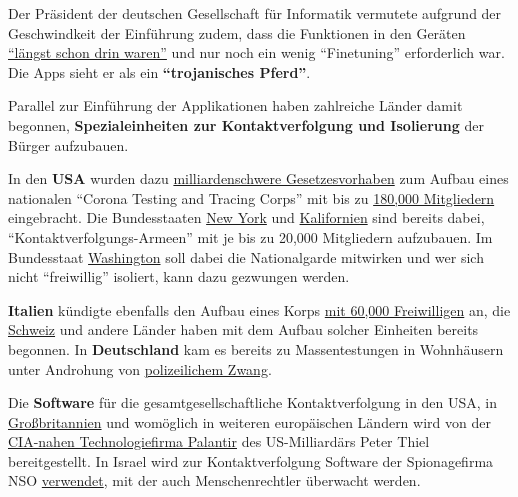 Der Präsident der deutschen Gesellschaft für Informatik vermutete
aufgrund der Geschwindkeit der Einführung zudem, dass die Funktionen in
den Geräten
\href{https://www.heise.de/news/Informatiker-Die-Corona-App-ist-wie-ein-trojanisches-Pferd-4764560.html}{``längst
schon drin waren''} und nur noch ein wenig ``Finetuning'' erforderlich
war. Die Apps sieht er als ein \textbf{``trojanisches Pferd''}.

Parallel zur Einführung der Applikationen haben zahlreiche Länder damit
begonnen, \textbf{Spezialeinheiten zur Kontaktverfolgung und Isolierung}
der Bürger aufzubauen.

In den \textbf{USA} wurden dazu
\href{https://heavy.com/news/2020/05/hr-6666-trace-bill-bobby-rush/}{milliardenschwere
Gesetzesvorhaben} zum Aufbau eines nationalen ``Corona Testing and
Tracing Corps'' mit bis zu
\href{https://www.washingtonpost.com/opinions/2020/05/29/corona-corps-could-fight-virus-youth-unemployment/}{180,000
Mitgliedern} eingebracht. Die Bundesstaaten
\href{https://www.jhsph.edu/news/news-releases/2020/johns-hopkins-and-bloomberg-philanthropies-with-new-york-state-launch-online-course-to-train-army-of-contact-tracers-to-slow-spread-of-COVID-19.html}{New
York} und
\href{https://timesofsandiego.com/tech/2020/05/06/california-training-a-20000-person-army-of-coronavirus-tracers/}{Kalifornien}
sind bereits dabei, ``Kontaktverfolgungs-Armeen'' mit je bis zu 20,000
Mitgliedern aufzubauen. Im Bundesstaat
\href{https://lynnwoodtimes.com/2020/05/12/governor-inslee-lays-out-statewide-contact-tracing-plan-for-covid-19/}{Washington}
soll dabei die Nationalgarde mitwirken und wer sich nicht ``freiwillig''
isoliert, kann dazu gezwungen werden.

\textbf{Italien} kündigte ebenfalls den Aufbau eines Korps
\href{https://www.thelocal.it/20200525/italy-seeks-60000-volunteers-to-enforce-coronavirus-rules}{mit
60,000 Freiwilligen} an, die
\href{https://www.nzz.ch/zuerich/coronavirus-in-zuerich-contact-tracing-ist-gut-angelaufen-ld.1556846}{Schweiz}
und andere Länder haben mit dem Aufbau solcher Einheiten bereits
begonnen. In \textbf{Deutschland} kam es bereits zu Massentestungen in
Wohnhäusern unter Androhung von
\href{https://www.youtube.com/watch?v=6ZQFpnskP8g}{polizeilichem Zwang}.

Die \textbf{Software} für die gesamtgesellschaftliche Kontaktverfolgung
in den USA, in
\href{https://www.telegraph.co.uk/technology/2020/05/16/inside-story-cia-backed-palantir-embedded-nhs-socialite-running/}{Großbritannien}
und womöglich in weiteren europäischen Ländern wird von der
\href{https://techcrunch.com/2020/04/01/palantir-coronavirus-cdc-nhs-gotham-foundry/}{CIA-nahen
Technologiefirma Palantir} des US-Milliardärs Peter Thiel
bereitgestellt. In Israel wird zur Kontaktverfolgung Software der
Spionagefirma NSO
\href{https://www.techdirt.com/articles/20200402/14261944226/controversial-spyware-vendor-nso-group-is-helping-israeli-government-spy-own-citizens.shtml}{verwendet},
mit der auch Menschenrechtler überwacht werden.

